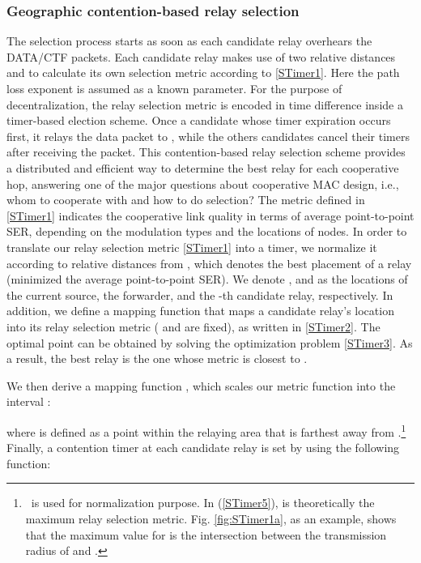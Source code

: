 \documentclass[journal,twoside,final]{IEEEtran}
\begin{document}
\subsubsection{Geographic contention-based relay selection}
The selection process starts as soon as each candidate relay overhears the DATA/CTF packets. Each candidate relay makes use of two relative distances  and  to calculate its own selection metric according to \eqref{STimer1}. Here the path loss exponent is assumed as a known parameter. For the purpose of decentralization, the relay selection metric  is encoded in time difference inside a timer-based election scheme. Once a candidate whose timer expiration occurs first, it relays the data packet to , while the others candidates cancel their timers after receiving the packet. This contention-based relay selection scheme provides a distributed and efficient way to determine the best relay for each cooperative hop, answering one of the major questions about cooperative MAC design, i.e., whom to cooperate with and how to do selection? The metric defined in \eqref{STimer1} indicates the cooperative link quality in terms of average point-to-point SER, depending on the modulation types and the locations of nodes. In order to translate our relay selection metric \eqref{STimer1} into a timer, we normalize it according to relative distances from , which denotes the best placement of a relay (minimized the average point-to-point SER). We denote , and  as the locations of the current source, the forwarder, and the -th candidate relay, respectively. In addition, we define a mapping function  that maps a candidate relay's location into its relay selection metric ( and  are fixed), as written in \eqref{STimer2}. The optimal point  can be obtained by solving the optimization problem \eqref{STimer3}. As a result, the best relay is the one whose metric is closest to .




We then derive a mapping function , which scales our metric function  into the interval :

where  is defined as a point within the relaying area that is farthest away from .\footnote{\, is used for normalization purpose. In (\ref{STimer5}),  is theoretically the maximum relay selection metric. Fig. \ref{fig:STimer1a}, as an example, shows that the maximum value for  is the intersection between the transmission radius of  and .}
Finally, a contention timer at each candidate relay is set by using the following function:
\end{document}
